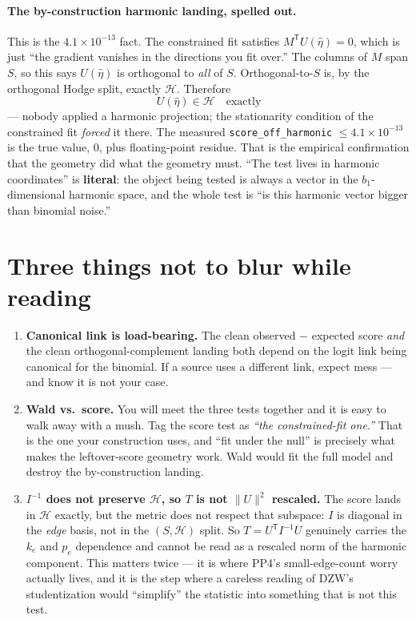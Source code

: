 \documentclass[11pt,a4paper]{article}
\newcommand{\Hh}{\mathcal{H}}
\newcommand{\Tr}{{\mathsf T}}
\theoremstyle{definition}
\begin{document}
\paragraph{The by-construction harmonic landing, spelled out.}
This is the $4.1\times10^{-13}$ fact. The constrained fit satisfies
$M^{\Tr}U(\hat\eta)=0$, which is just ``the gradient vanishes in the directions
you fit over.'' The columns of $M$ span $S$, so this says $U(\hat\eta)$ is
orthogonal to \emph{all} of $S$. Orthogonal-to-$S$ is, by the orthogonal Hodge
split, exactly $\Hh$. Therefore
\[
  U(\hat\eta)\in\Hh \quad\text{exactly}
\]
--- nobody applied a harmonic projection; the stationarity condition of the
constrained fit \emph{forced} it there. The measured
\texttt{score\_off\_harmonic} $\le 4.1\times10^{-13}$ is the true value, $0$,
plus floating-point residue. That is the empirical confirmation that the geometry
did what the geometry must. ``The test lives in harmonic coordinates'' is
\textbf{literal}: the object being tested is always a vector in the
$b_1$-dimensional harmonic space, and the whole test is ``is this harmonic vector
bigger than binomial noise.''

\section{Three things not to blur while reading}

\begin{enumerate}[leftmargin=1.6em,itemsep=0.5em]
\item \textbf{Canonical link is load-bearing.} The clean observed $-$ expected
  score \emph{and} the clean orthogonal-complement landing both depend on the
  logit link being canonical for the binomial. If a source uses a different link,
  expect mess --- and know it is not your case.

\item \textbf{Wald vs.\ score.} You will meet the three tests together and it is
  easy to walk away with a mush. Tag the score test as \emph{``the
  constrained-fit one.''} That is the one your construction uses, and ``fit under
  the null'' is precisely what makes the leftover-score geometry work. Wald would
  fit the full model and destroy the by-construction landing.

\item \textbf{$I^{-1}$ does not preserve $\Hh$, so $T$ is not $\|U\|^2$
  rescaled.} The score lands in $\Hh$ exactly, but the metric does not respect
  that subspace: $I$ is diagonal in the \emph{edge} basis, not in the
  $(S,\Hh)$ split. So $T=U^{\Tr}I^{-1}U$ genuinely carries the $k_e$ and $p_e$
  dependence and cannot be read as a rescaled norm of the harmonic component.
  This matters twice --- it is where PP4's small-edge-count worry actually lives,
  and it is the step where a careless reading of DZW's studentization would
  ``simplify'' the statistic into something that is not this test.
\end{enumerate}
\end{document}
